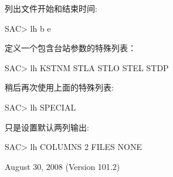 列出文件开始和结束时间:
\begin{SACCode}
SAC> lh b e
\end{SACCode}

定义一个包含台站参数的特殊列表：
\begin{SACCode}
SAC> lh KSTNM STLA STLO STEL STDP
\end{SACCode}

稍后再次使用上面的特殊列表:
\begin{SACCode}
SAC> lh SPECIAL
\end{SACCode}

只是设置默认两列输出:
\begin{SACCode}
SAC> lh COLUMNS 2 FILES NONE
\end{SACCode}

August 30, 2008 (Version 101.2)
